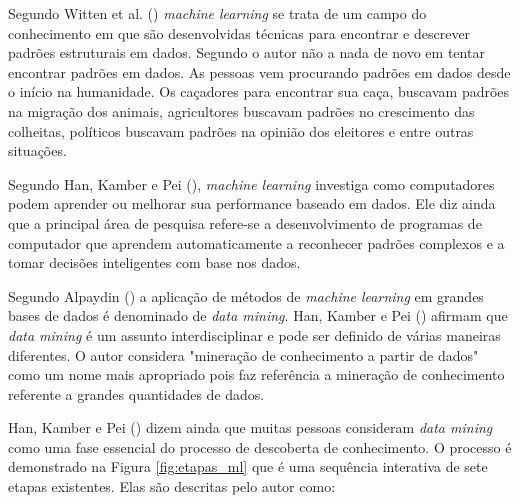 Segundo Witten et al. (\citeyear{Witten:2016:DMF:3086818}) \textit{machine learning} se trata de um campo do conhecimento em que são desenvolvidas técnicas para encontrar e descrever padrões estruturais em dados. Segundo o autor não a nada de novo em tentar encontrar padrões em dados. As pessoas vem procurando padrões em dados desde o início na humanidade. Os caçadores para encontrar sua caça, buscavam padrões na migração dos animais, agricultores buscavam padrões no crescimento das colheitas, políticos buscavam padrões na opinião dos eleitores e entre outras situações. 

Segundo Han, Kamber e Pei (\citeyear{Han:2011:DMC:1972541}), \textit{machine learning} investiga como computadores podem aprender ou melhorar sua performance baseado em dados. Ele diz ainda que a principal área de pesquisa refere-se a desenvolvimento de programas de computador que aprendem automaticamente a reconhecer padrões complexos e a tomar decisões inteligentes com base nos dados.

Segundo Alpaydin (\citeyear{Alpaydin:2010:IML:1734076}) a aplicação de métodos de \textit{machine learning} em grandes bases de dados é denominado de \textit{data mining}. Han, Kamber e Pei (\citeyear{Han:2011:DMC:1972541}) afirmam que \textit{data mining} é um assunto interdisciplinar e pode ser definido de várias maneiras diferentes. O autor considera "mineração de conhecimento a partir de dados" como um nome mais apropriado pois faz referência a mineração de conhecimento referente a grandes quantidades de dados.

Han, Kamber e Pei (\citeyear{Han:2011:DMC:1972541}) dizem ainda que muitas pessoas consideram \textit{data mining} como uma fase essencial do processo de descoberta de conhecimento. O processo é demonstrado na Figura \ref{fig:etapas_ml} que é uma sequência interativa de sete etapas existentes. Elas são descritas pelo autor como:


